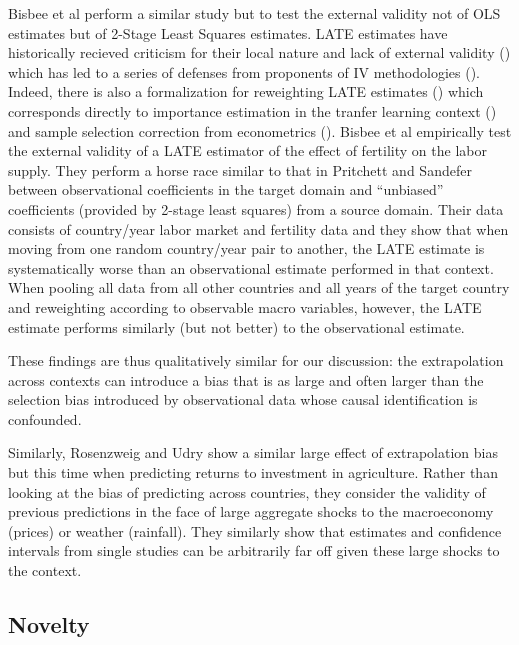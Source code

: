 \documentclass[a4paper,12pt]{article}
\begin{document}
Bisbee et al \parencite*{Bisbee2017} perform a similar study but to test the external validity not of OLS estimates but of 2-Stage Least Squares estimates. LATE estimates have historically recieved criticism for their local nature and lack of external validity (\cite{Deaton2010}) which has led to a series of defenses from proponents of IV methodologies (\cite{Imbens2009}). Indeed, there is also a formalization for reweighting LATE estimates (\cite{Angrist2011}) which corresponds directly to importance estimation in the tranfer learning context (\cite{Suigyama2007}) and sample selection correction from econometrics (\cite{Manski1977}). Bisbee et al empirically test the external validity of a LATE estimator of the effect of fertility on the labor supply. They perform a horse race similar to that in Pritchett and Sandefer \parencite*{Pritchett2016} between observational coefficients in the target domain and ``unbiased'' coefficients (provided by 2-stage least squares) from a source domain. Their data consists of country/year labor market and fertility data and they show that when moving from one random country/year pair to another, the LATE estimate is systematically worse than an observational estimate performed in that context. When pooling all data from all other countries and all years of the target country and reweighting according to observable macro variables, however, the LATE estimate performs similarly (but not better) to the observational estimate. 

These findings are thus qualitatively similar for our discussion: the extrapolation across contexts can introduce a bias that is as large and often larger than the selection bias introduced by observational data whose causal identification is confounded.

Similarly, Rosenzweig and Udry \parencite*{Rosenzweig2019} show a similar large effect of extrapolation bias but this time when predicting returns to investment in agriculture. Rather than looking at the bias of predicting across countries, they consider the validity of previous predictions in the face of large aggregate shocks to the macroeconomy (prices) or weather (rainfall). They similarly show that estimates and confidence intervals from single studies can be arbitrarily far off given these large shocks to the context.

\subsection{ Novelty }
\end{document}
